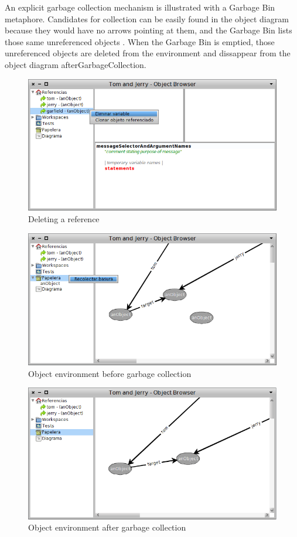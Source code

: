 \documentclass{sigplanconf}
\begin{document}
An explicit garbage collection mechanism is illustrated with a Garbage Bin metaphore. Candidates for collection can be easily found in the object diagram because they would have no arrows pointing at them, and the Garbage Bin lists those same unreferenced objects . When the Garbage Bin is emptied, those unreferenced objects are deleted from the environment and dissappear from the object diagram  {afterGarbageCollection}.
\begin{figure}[h]
 \centering
 \includegraphics[scale=.35]{./images/deletingAReference.png}
 \caption{Deleting a reference}
 \label{fig:deletingAReference}
\end{figure}
\begin{figure}[h]
 \centering
 \includegraphics[scale=.35]{./images/beforeGarbageCollection.png}
 \caption{Object environment before garbage collection}
 \label{fig:beforeGarbageCollection}
\end{figure}
\begin{figure}[h]
 \centering
 \includegraphics[scale=.35]{./images/afterGarbageCollection.png}
 \caption{Object environment after garbage collection}
 \label{fig:afterGarbageCollection}
\end{figure}
\end{document}
